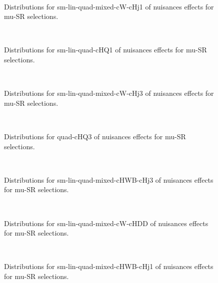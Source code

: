 \begin{figure}[htbp]  
\centering 
\\ 
\caption{ 
   Distributions for sm-lin-quad-mixed-cW-cHj1 of nuisances effects for mu-SR selections.
} 
\label{fig:sm_lin_quad_mixed_cW_cHj1_mu_SR} 
\end{figure} 




\begin{figure}[htbp]  
\centering 
\\ 
\caption{ 
   Distributions for sm-lin-quad-cHQ1 of nuisances effects for mu-SR selections.
} 
\label{fig:sm_lin_quad_cHQ1_mu_SR} 
\end{figure} 




\begin{figure}[htbp]  
\centering 
\\ 
\caption{ 
   Distributions for sm-lin-quad-mixed-cW-cHj3 of nuisances effects for mu-SR selections.
} 
\label{fig:sm_lin_quad_mixed_cW_cHj3_mu_SR} 
\end{figure} 




\begin{figure}[htbp]  
\centering 
\\ 
\caption{ 
   Distributions for quad-cHQ3 of nuisances effects for mu-SR selections.
} 
\label{fig:quad_cHQ3_mu_SR} 
\end{figure} 




\begin{figure}[htbp]  
\centering 
\\ 
\caption{ 
   Distributions for sm-lin-quad-mixed-cHWB-cHj3 of nuisances effects for mu-SR selections.
} 
\label{fig:sm_lin_quad_mixed_cHWB_cHj3_mu_SR} 
\end{figure} 




\begin{figure}[htbp]  
\centering 
\\ 
\caption{ 
   Distributions for sm-lin-quad-mixed-cW-cHDD of nuisances effects for mu-SR selections.
} 
\label{fig:sm_lin_quad_mixed_cW_cHDD_mu_SR} 
\end{figure} 




\begin{figure}[htbp]  
\centering 
\\ 
\caption{ 
   Distributions for sm-lin-quad-mixed-cHWB-cHj1 of nuisances effects for mu-SR selections.
} 
\label{fig:sm_lin_quad_mixed_cHWB_cHj1_mu_SR} 
\end{figure} 




